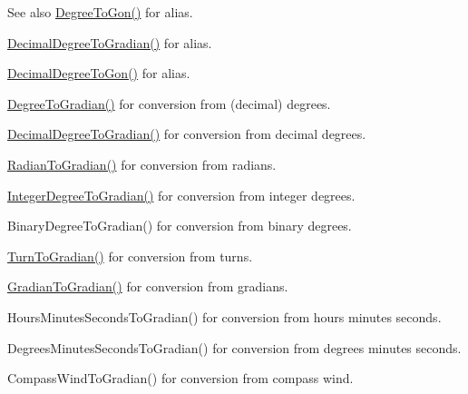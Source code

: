 \begin{DoxySeeAlso}{See also}
\mbox{\hyperlink{group___e_g_x_math-_angle_conversions-_degree_ga87c3fab0867021e5d2501197b4db6194}{Degree\+To\+Gon()}} for alias. 

\mbox{\hyperlink{group___e_g_x_math-_angle_conversions-_decimal_degree_ga3ac6f1ceb36a4938cdf3b55554734c99}{Decimal\+Degree\+To\+Gradian()}} for alias. 

\mbox{\hyperlink{group___e_g_x_math-_angle_conversions-_decimal_degree_gaeb333a1ad0aeb913c025fbd1be85fcb3}{Decimal\+Degree\+To\+Gon()}} for alias. 

\mbox{\hyperlink{group___e_g_x_math-_angle_conversions-_degree_ga25bb5506b3f66fff7a1b85bf7bd795b3}{Degree\+To\+Gradian()}} for conversion from (decimal) degrees. 

\mbox{\hyperlink{group___e_g_x_math-_angle_conversions-_decimal_degree_ga3ac6f1ceb36a4938cdf3b55554734c99}{Decimal\+Degree\+To\+Gradian()}} for conversion from decimal degrees. 

\mbox{\hyperlink{group___e_g_x_math-_angle_conversions-_radian_ga3c1607eae50cbf0186c42485bb3878d5}{Radian\+To\+Gradian()}} for conversion from radians. 

\mbox{\hyperlink{group___e_g_x_math-_angle_conversions-_integer_degree_ga47127467ff7a8ef57f6be9ce496a97df}{Integer\+Degree\+To\+Gradian()}} for conversion from integer degrees. 

Binary\+Degree\+To\+Gradian() for conversion from binary degrees. 

\mbox{\hyperlink{group___e_g_x_math-_angle_conversions-_turn_gad6aa9bdde2cde17cec136b24ee017bba}{Turn\+To\+Gradian()}} for conversion from turns. 

\mbox{\hyperlink{group___e_g_x_math-_angle_conversions-_gradian_ga0dcd5b58c4073a9df5e0a210aca307ce}{Gradian\+To\+Gradian()}} for conversion from gradians. 

Hours\+Minutes\+Seconds\+To\+Gradian() for conversion from hours minutes seconds. 

Degrees\+Minutes\+Seconds\+To\+Gradian() for conversion from degrees minutes seconds. 

Compass\+Wind\+To\+Gradian() for conversion from compass wind. 
\end{DoxySeeAlso}
\mbox{\label{group___e_g_x_math-_angle_conversions-_degree_ga0bb223ca6e77b00439a6d910ab32d82e}} 
